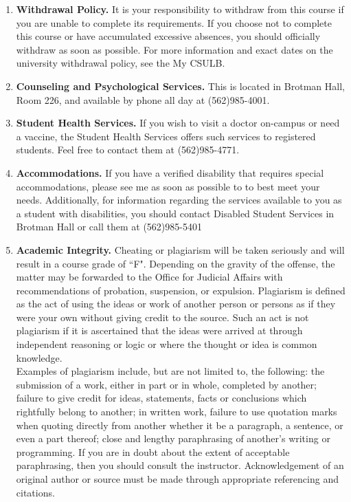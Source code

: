 \documentclass[9pt]{article}
\begin{document}
\begin{enumerate}
   \item \textbf{Withdrawal Policy.} It is your responsibility to withdraw from
         this course if you are unable to complete its requirements. If you
         choose not to complete this course or have accumulated excessive
         absences, you should officially withdraw as soon as possible. For more
         information and exact dates on the university withdrawal policy, see
         the My CSULB.
   \item \textbf{Counseling and Psychological Services.} This is located in
         Brotman Hall, Room 226, and available by phone all day at (562)985-4001.
   \item \textbf{Student Health Services.} If you wish to visit a doctor
         on-campus or need a vaccine, the Student Health Services offers such
         services to registered students. Feel free to contact them at
         (562)985-4771.
   \item \textbf{Accommodations.} If you have a verified disability that
         requires special accommodations, please see me as soon as possible to
         to best meet your needs. Additionally, for information regarding the
         services available to you as a student with disabilities, you should
         contact Disabled Student Services in Brotman Hall or call them at
         (562)985-5401
   \item \textbf{Academic Integrity.} Cheating or plagiarism will be taken 
         seriously and will result in a course grade of ``F". Depending on the
         gravity of the offense, the matter may be forwarded to the Office for
         Judicial Affairs with recommendations of probation, suspension, or
         expulsion. Plagiarism is defined as the act of using the ideas or work
         of another person or persons as if they were your own without giving
         credit to the source. Such an act is not plagiarism if it is
         ascertained that the ideas were arrived at through independent
         reasoning or logic or where the thought or idea is common knowledge. \\
         
         Examples of plagiarism include, but are not limited to, the following:
         the submission of a work, either in part or in whole, completed by
         another; failure to give credit for ideas, statements, facts or
         conclusions which rightfully belong to another; in written work,
         failure to use quotation marks when quoting directly from another
         whether it be a paragraph, a sentence, or even a part thereof; close
         and lengthy paraphrasing of another's writing or programming. If you
         are in doubt about the extent of acceptable paraphrasing, then you
         should consult the instructor. Acknowledgement of an original author or
         source must be made through appropriate referencing and citations.
         

\end{enumerate}
\end{document}
